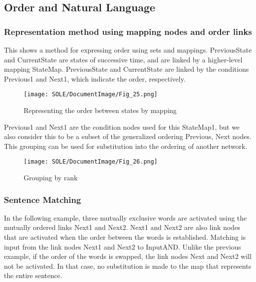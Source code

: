 \documentclass[12pt]{article}
\begin{document}
\subsection{Order and Natural Language}\label{order-and-natural-language}

\subsubsection{Representation method using mapping nodes and order
links}\label{representation-method-using-mapping-nodes-and-order-links}

This shows a method for expressing order using sets and mappings.
PreviousState and CurrentState are states of successive time, and are
linked by a higher-level mapping StateMap. PreviousState and
CurrentState are linked by the conditions Previous1 and Next1, which
indicate the order, respectively.

\begin{figure}[ht]
  \centering
  \texttt{[image: SOLE/DocumentImage/Fig\_25.png]}
  \caption{Representing the order between states by mapping}
  \label{fig:representing_the_order_between_states_by_mapping}
\end{figure}

Previous1 and Next1 are the condition nodes used for this StateMap1, but
we also consider this to be a subset of the generalized ordering
Previous, Next nodes. This grouping can be used for substitution into
the ordering of another network.

\begin{figure}[ht]
  \centering
  \texttt{[image: SOLE/DocumentImage/Fig\_26.png]}
  \caption{Grouping by rank}
  \label{fig:grouping_by_rank}
\end{figure}

\subsubsection{Sentence Matching}\label{sentence-matching}

In the following example, three mutually exclusive words are activated
using the mutually ordered links Next1 and Next2. Next1 and Next2 are
also link nodes that are activated when the order between the words is
established. Matching is input from the link nodes Next1 and Next2 to
InputAND. Unlike the previous example, if the order of the words is
swapped, the link nodes Next and Next2 will not be activated. In that
case, no substitution is made to the map that represents the entire
sentence.
\end{document}
